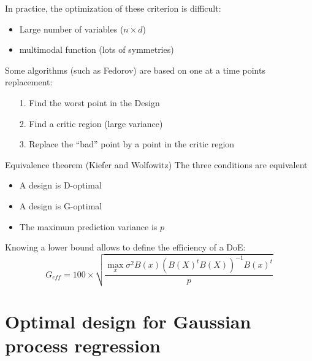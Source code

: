 \documentclass{beamer}
\begin{document}
\begin{frame}{}
In practice, the optimization of these criterion is difficult:
\begin{itemize}
	\item Large number of variables ($n \times d$)
	\item multimodal function (lots of symmetries)
\end{itemize}
\vspace{10mm}
Some algorithms (such as Fedorov) are based on one at a time points replacement:
\begin{itemize}
 	\item[1.] Find the worst point in the Design
 	\item[2.] Find a critic region (large variance)
 	\item[3.] Replace the ``bad'' point by a point in the critic region
 \end{itemize}
\end{frame}

\begin{frame}{}
\begin{block}{Equivalence theorem (Kiefer and Wolfowitz)}
The three conditions are equivalent
\begin{itemize}
 	\item A design is D-optimal
 	\item A design is G-optimal
 	\item The maximum prediction variance is $p$
 \end{itemize}
\end{block}
\vspace{5mm}
Knowing a lower bound allows to define the efficiency of a DoE:
$$G_{eff} = 100 \times \sqrt{ \frac{\max_x \sigma^2 B(x) (B(X)^t B(X))^{-1} B(x)^t}{p}}$$
\end{frame}

\section[Optimal DoE for GPR]{Optimal design for Gaussian process regression}
\subsection{}

\end{document}
